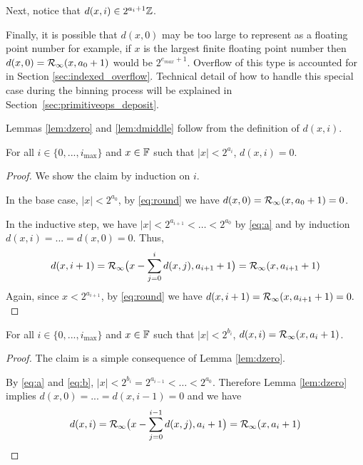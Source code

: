     Next, notice that $d(x, i) \in 2^{a_{i} + 1}\mathbb{Z}$.

    Finally, it is possible that $d(x, 0)$ may be too large to represent as a
    floating point number for example, if $x$ is the largest finite floating point
    number then $d(x,0)=\mathcal{R}_\text{$\infty$}(x, a_0+1)$ would be $2^{e_{max}+1}$.
    Overflow of this type is accounted for in Section \ref{sec:indexed_overflow}.
    Technical detail of how to handle this special case during the binning process
    will be explained in Section~\ref{sec:primitiveops_deposit}.

    Lemmas \ref{lem:dzero} and \ref{lem:dmiddle} follow from the definition of $d(x, i)$.

    \begin{samepage}
    \begin{lem}
      For all $i \in \{0, ..., i_{\max}\}$ and $x \in \mathbb{F}$ such that $|x| < 2^{a_i}$,
      $d(x, i) = 0.$
      \label{lem:dzero}
    \end{lem}
    \end{samepage}

    \begin{proof}
      We show the claim by induction on $i$.

      In the base case, $|x| < 2^{a_0}$, by \eqref{eq:round} we have
      $d(x, 0) = \mathcal{R}_\text{$\infty$}(x, a_0 + 1) = 0$.

      In the inductive step, we have $|x| < 2^{a_{i + 1}} < \ldots < 2^{a_0}$ by \eqref{eq:a}
      and by induction $d(x, i)= ... = d(x, 0) = 0$. Thus,
      \[
        d(x, i + 1) = \mathcal{R}_\text{$\infty$}\bigl(x - \sum\limits_{j = 0}^{i}d(x, j), a_{i + 1} + 1\bigr)
            = \mathcal{R}_\text{$\infty$}(x, a_{i+1} + 1)
      \]
      Again, since $x < 2^{a_{i+1}}$, by \eqref{eq:round} we have
      \(
        d(x, i + 1) = \mathcal{R}_\text{$\infty$}(x, a_{i + 1} + 1) = 0.
      \)
    \end{proof}

    \begin{samepage}
    \begin{lem}
      For all $i \in \{0, ..., i_{\max}\}$ and $x \in \mathbb{F}$ such that $|x| < 2^{b_i}$,
      $d(x, i) = \mathcal{R}_\text{$\infty$}(x, a_i + 1)$.
      \label{lem:dmiddle}
    \end{lem}
    \end{samepage}

    \begin{proof}
      The claim is a simple consequence of Lemma \ref{lem:dzero}.

      By  \eqref{eq:a} and \eqref{eq:b}, $|x| < 2^{b_i} = 2^{a_{i - 1}} < \ldots <2^{a_0}$.
      Therefore Lemma \ref{lem:dzero} implies $d(x, 0) = ... = d(x, i - 1) = 0$
      and we have
      \[
        d(x, i) = \mathcal{R}_\text{$\infty$}\bigl(x - \sum\limits_{j = 0}^{i - 1}d(x, j), a_{i} + 1\bigr)
            = \mathcal{R}_\text{$\infty$}(x, a_{i} + 1)
      \]
    \end{proof}


